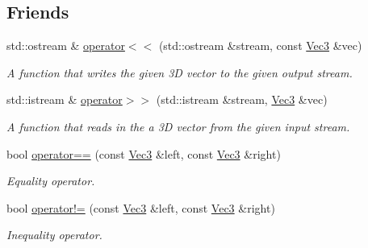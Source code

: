 \subsection*{Friends}
\begin{DoxyCompactItemize}
\item 
std\+::ostream \& \hyperlink{classgofxmath_1_1_vec3_a9902784eb40b0c5ee0378e1c2526eb1e}{operator$<$$<$} (std\+::ostream \&stream, const \hyperlink{classgofxmath_1_1_vec3}{Vec3} \&vec)
\begin{DoxyCompactList}\small\item\em A function that writes the given 3\+D vector to the given output stream. \end{DoxyCompactList}\item 
std\+::istream \& \hyperlink{classgofxmath_1_1_vec3_acf645c325558f6e8eabcbad87b4eea50}{operator$>$$>$} (std\+::istream \&stream, \hyperlink{classgofxmath_1_1_vec3}{Vec3} \&vec)
\begin{DoxyCompactList}\small\item\em A function that reads in the a 3\+D vector from the given input stream. \end{DoxyCompactList}\item 
bool \hyperlink{classgofxmath_1_1_vec3_a73bad4468d068dd9b46b313330874c0c}{operator==} (const \hyperlink{classgofxmath_1_1_vec3}{Vec3} \&left, const \hyperlink{classgofxmath_1_1_vec3}{Vec3} \&right)
\begin{DoxyCompactList}\small\item\em Equality operator. \end{DoxyCompactList}\item 
bool \hyperlink{classgofxmath_1_1_vec3_ad5a37b5aca0611e88fb74d9dd01f307a}{operator!=} (const \hyperlink{classgofxmath_1_1_vec3}{Vec3} \&left, const \hyperlink{classgofxmath_1_1_vec3}{Vec3} \&right)
\begin{DoxyCompactList}\small\item\em Inequality operator. \end{DoxyCompactList}\end{DoxyCompactItemize}
